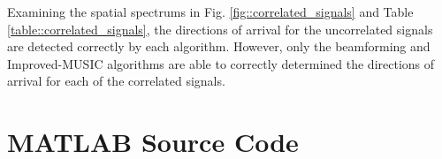 \documentclass[conference]{IEEEtran}
\begin{document}
		Examining the spatial spectrums in Fig. \ref{fig::correlated_signals} and Table \ref{table::correlated_signals}, the directions of arrival for the uncorrelated signals are detected correctly by each algorithm. However, only the beamforming and Improved-MUSIC algorithms are able to correctly determined the directions of arrival for each of the correlated signals.
		
		
		
		
	
	
	\onecolumn
	\pagebreak
	\appendices
	\section{MATLAB Source Code}
	\label{appendix::matlab_code}
\end{document}
